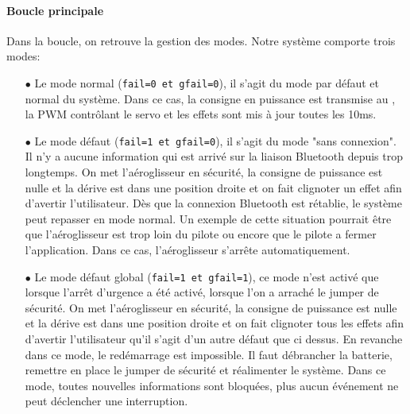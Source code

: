			\paragraph{Boucle principale} Dans la boucle, on retrouve la gestion des modes. Notre système comporte trois modes:
			\begin{itemize}
			\item[$\bullet$] Le mode normal (\texttt{fail=0 et gfail=0}), il s'agit du mode par défaut et normal du système. Dans ce cas, la consigne en puissance est transmise au \dspic, la PWM contrôlant le servo et les effets sont mis à jour toutes les 10ms.
			\item[$\bullet$] Le mode défaut (\texttt{fail=1 et gfail=0}), il s'agit du mode "sans connexion". Il n'y a aucune information qui est arrivé sur la liaison Bluetooth depuis trop longtemps. On met l'aéroglisseur en sécurité, la consigne de puissance est nulle et la dérive est dans une position droite et on fait clignoter un effet afin d'avertir l'utilisateur. Dès que la connexion Bluetooth est rétablie, le système peut repasser en mode normal. Un exemple de cette situation pourrait être que l'aéroglisseur est trop loin du pilote ou encore que le pilote a fermer l'application. Dans ce cas, l'aéroglisseur s'arrête automatiquement.
			\item[$\bullet$] Le mode défaut global (\texttt{fail=1 et gfail=1}), ce mode n'est activé que lorsque l'arrêt d'urgence a été activé, lorsque l'on a arraché le jumper de sécurité. On met l'aéroglisseur en sécurité, la consigne de puissance est nulle et la dérive est dans une position droite et on fait clignoter tous les effets afin d'avertir l'utilisateur qu'il s'agit d'un autre défaut que ci dessus. En revanche dans ce mode, le redémarrage est impossible. Il faut débrancher la batterie, remettre en place le jumper de sécurité et réalimenter le système. Dans ce mode, toutes nouvelles informations sont bloquées, plus aucun événement ne peut déclencher une interruption. 
			\end{itemize}
			
			
